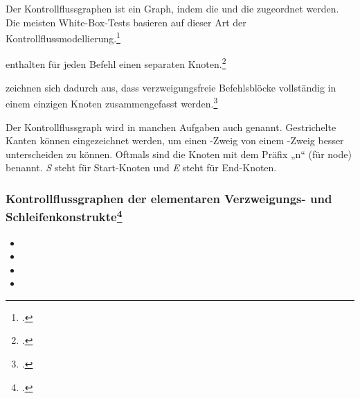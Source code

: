 \documentclass{lehramt-informatik-haupt}
\begin{document}
Der  Kontrollﬂussgraphen ist ein Graph, indem
die  und die
 zugeordnet werden. Die
meisten White-Box-Tests basieren auf dieser Art der
Kontrollﬂussmodellierung.\footcite[Seite 203]{hoffmann:software}

 enthalten für jeden Befehl einen
separaten Knoten.\footcite[Seite 204]{hoffmann:software}

 zeichnen sich dadurch aus, dass
verzweigungsfreie Befehlsblöcke vollständig in einem einzigen Knoten
zusammengefasst werden.\footcite[Seite 204]{hoffmann:software}

Der Kontrollflussgraph wird in manchen Aufgaben auch
 genannt. Gestrichelte Kanten können
eingezeichnet werden, um einen -Zweig von einem
-Zweig besser unterscheiden zu können. Oftmals sind die
Knoten mit dem Präfix „n“ (für node) benannt. \emph{S} steht für
Start-Knoten und \emph{E} steht für End-Knoten.

\subsubsection{Kontrollflussgraphen der elementaren Verzweigungs- und
Schleifenkonstrukte\footcite[Seite 205]{hoffmann:software}}

\begin{itemize}
\item {}

\item {}

\item {}

\item {}
\end{itemize}

\def\beispiel{
\begin{center}
\begin{minipage}{4cm}
\liJavaDatei[firstline=4,lastline=16]{testen/Beispiel}
\end{minipage}
\begin{minipage}{4cm}
\begin{liKontrollflussgraph}
\node at (-2,1) (S) {S};
\node at (-1,1.5) (1) {1};
\node at (0,2) (2) {2};
\node at (1,3) (3) {3};
\node at (1,4) (4) {4};
\node at (0,5) (5) {5};
\node at (1,6) (6) {6};
\node at (0,7) (E) {E};

\path (S) -- (1);
\path (1) -- (2);
\path[wahr] (2) -- (3) \liBedingung{right,pos=0}{y > x};
\path[falsch] (2) -- (5) \liBedingung{left}{y <= x};
\path (3) -- (4);
\path (4) -- (5);
\path[wahr] (5) -- (6) \liBedingung{right,pos=0}{2 * max < 3 * min};
\path[falsch] (5) -- (E) \liBedingung{left}{2 * max >= 3 * min};
\path (6) -- (E);
\end{liKontrollflussgraph}
\end{minipage}
\end{center}
}
\end{document}

